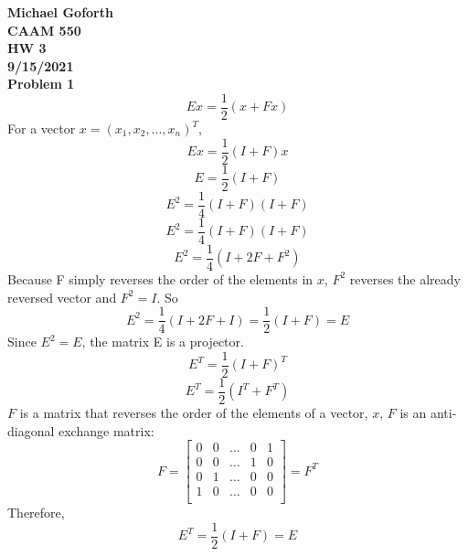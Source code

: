 \documentclass{article} %
\begin{document}
\textbf{Michael Goforth} \\
\textbf{CAAM 550} \\
\textbf{HW 3} \\
\textbf{9/15/2021} \\ 

\textbf{Problem 1} \\
\begin{equation}
Ex = \frac{1}{2}(x + Fx) 
\end{equation}
For a vector $x = (x_1, x_2, ..., x_n)^T$, 
\begin{equation}
Ex = \frac{1}{2}(I + F)x
\end{equation}
\begin{equation}
E = \frac{1}{2}(I + F)
\end{equation}
\begin{equation}
E^2 = \frac{1}{4}(I + F)(I + F)
\end{equation}
\begin{equation}
E^2 = \frac{1}{4}(I + F)(I + F)
\end{equation}
\begin{equation}
E^2 = \frac{1}{4}(I + 2F + F^2)
\end{equation}
Because F simply reverses the order of the elements in $x$, $F^2$ reverses the already reversed vector and $F^2 = I$.  So
\begin{equation}
E^2 = \frac{1}{4}(I + 2F + I) = \frac{1}{2}(I + F) = E
\end{equation}
Since $E^2=E$, the matrix E is a projector.
\begin{equation}
E^T = \frac{1}{2}(I + F)^T
\end{equation}
\begin{equation}
E^T = \frac{1}{2}(I^T + F^T)
\end{equation}
$F$ is a matrix that reverses the order of the elements of a vector, $x$, $F$ is an anti-diagonal exchange matrix:
\begin{equation}
F = 
\begin{bmatrix}
0 & 0 & \ldots & 0 & 1 \\
0 & 0 & \ldots & 1 & 0 \\
0 & 1 & \ldots & 0 & 0 \\
1 & 0 & \ldots & 0 & 0 \\
\end{bmatrix} = F^T
\end{equation}
Therefore,
\begin{equation}
E^T = \frac{1}{2}(I + F) = E
\end{equation}
\end{document}
